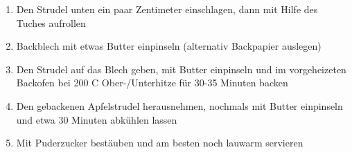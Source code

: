 \begin{enumerate}[noitemsep]
	\item Den Strudel unten ein paar Zentimeter einschlagen, dann mit Hilfe des Tuches aufrollen
	\item Backblech mit etwas Butter einpinseln (alternativ Backpapier auslegen)
	\item Den Strudel auf das Blech geben, mit Butter einpinseln und im vorgeheizeten Backofen bei 200 \textdegree C Ober-/Unterhitze für 30-35 Minuten backen
	\item  Den gebackenen Apfelstrudel herausnehmen, nochmals mit Butter einpinseln und etwa 30 Minuten abkühlen lassen
	\item Mit Puderzucker bestäuben und am besten noch lauwarm servieren
\end{enumerate}